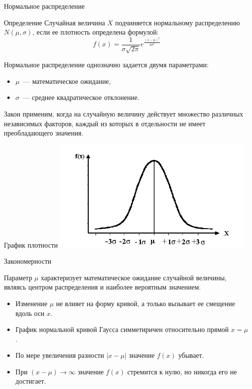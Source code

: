 \documentclass[unicode,11pt,notheorems,xcolor=table]{beamer}
\begin{document}
\begin{frame}{Нормальное распределение}{}
    \begin{block}{Определение}
        Случайная величина $X$ подчиняется \alert{нормальному распределению $N(\mu,\sigma)$}, если ее плотность определена формулой:
        $$
            f (x) = \frac{1}{\sigma \sqrt{2\pi}} e^{\tfrac{(x-\mu)^2}{2\sigma^2}}
        $$
    \end{block}
    Нормальное распределение однозначно задается двумя параметрами:
    \begin{itemize}
        \item $\mu$~--- математическое ожидание,
        \item $\sigma$~--- среднее квадратическое отклонение.
    \end{itemize}

    \begin{block}{}
    Закон применим, когда на случайную  величину действует множество различных независимых факторов, каждый из которых в отдельности не имеет преобладающего значения.
    \end{block}
\end{frame}
\begin{frame}{График плотности}{}
    \includegraphics[width=10cm]{N-1.png}
\end{frame}
\begin{frame}{Закономерности}
    \begin{block}{}
        Параметр $\mu$ характеризует математическое ожидание случайной величины, являясь центром распределения и наиболее вероятным значением. 
    \end{block}
    \begin{itemize}
        \item Изменение $\mu$ не влияет на форму кривой, а только вызывает ее смещение вдоль оси $x$. 
        \item График нормальной кривой Гаусса симметиричен относительно прямой $x=\mu$.
        \item По мере увеличения разности $|x-\mu|$ значение $f(x)$ убывает. 
        \item При $(x-\mu)\to \infty$ значение $f(x)$ стремится к нулю, но никогда его не достигает. 
    \end{itemize}
    
\end{frame}
\end{document}

